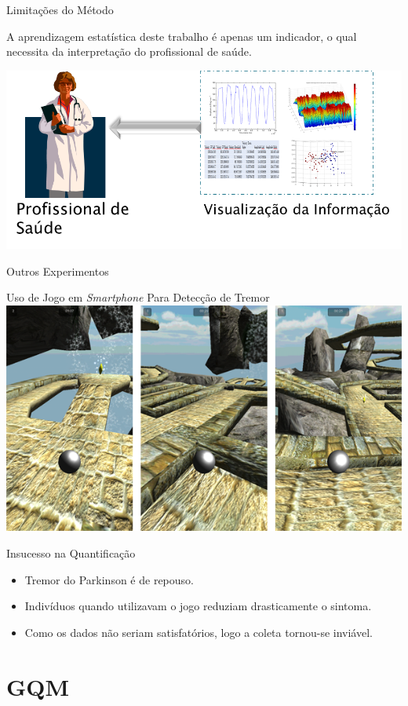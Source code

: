 \documentclass{beamer}
\begin{document}
\begin{frame}{Limitações do Método}
	\begin{block}{}
	A aprendizagem estatística deste trabalho é apenas um indicador, o qual necessita da interpretação do profissional de saúde.
	\end{block}
  \begin{block}{}
      \center \includegraphics[height=2 in]{img/visualizacaomedico.png}
  \end{block}
\end{frame}

\begin{frame}{Outros Experimentos}
	\begin{block}{Uso de Jogo em \textit{Smartphone} Para Detecção de Tremor}
	\center \includegraphics[height=1 in]{img/pinball_world.png}
	\end{block}
	\begin{block}{Insucesso na Quantificação}
			\begin{itemize}[<+->]
			\item Tremor do Parkinson é de repouso.
			\item Indivíduos quando utilizavam o jogo reduziam drasticamente o sintoma.
			\item Como os dados não seriam satisfatórios, logo a coleta tornou-se inviável.
		\end{itemize}
	\end{block}
\end{frame}






\section{GQM}
\end{document}
